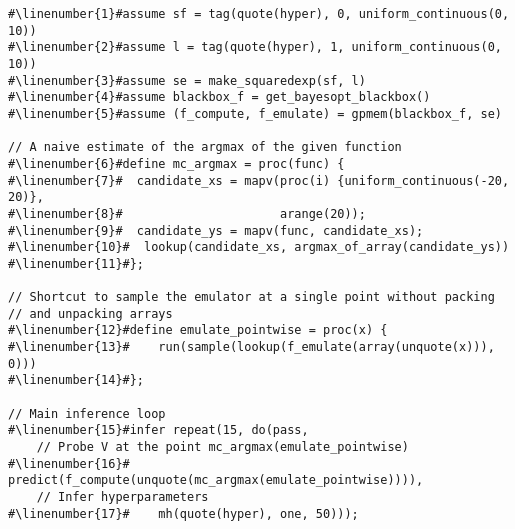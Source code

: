 \begin{mdframed}
\begin{minipage}{\linewidth}
\small
\belowcaptionskip=-10pt
\begin{lstlisting}[caption={Bayesian optimization using \gpmem},mathescape,numbers=none,label=alg:bayesopt,escapechar=\#]
#\linenumber{1}#assume sf = tag(quote(hyper), 0, uniform_continuous(0, 10))
#\linenumber{2}#assume l = tag(quote(hyper), 1, uniform_continuous(0, 10))
#\linenumber{3}#assume se = make_squaredexp(sf, l)
#\linenumber{4}#assume blackbox_f = get_bayesopt_blackbox()
#\linenumber{5}#assume (f_compute, f_emulate) = gpmem(blackbox_f, se)

// A naive estimate of the argmax of the given function
#\linenumber{6}#define mc_argmax = proc(func) {
#\linenumber{7}#  candidate_xs = mapv(proc(i) {uniform_continuous(-20, 20)},
#\linenumber{8}#                      arange(20));
#\linenumber{9}#  candidate_ys = mapv(func, candidate_xs);
#\linenumber{10}#  lookup(candidate_xs, argmax_of_array(candidate_ys))
#\linenumber{11}#};

// Shortcut to sample the emulator at a single point without packing
// and unpacking arrays
#\linenumber{12}#define emulate_pointwise = proc(x) {
#\linenumber{13}#    run(sample(lookup(f_emulate(array(unquote(x))), 0)))
#\linenumber{14}#};

// Main inference loop
#\linenumber{15}#infer repeat(15, do(pass,
    // Probe V at the point mc_argmax(emulate_pointwise)
#\linenumber{16}#    predict(f_compute(unquote(mc_argmax(emulate_pointwise)))),
    // Infer hyperparameters
#\linenumber{17}#    mh(quote(hyper), one, 50)));
\end{lstlisting}
  
\end{minipage}
\end{mdframed}     